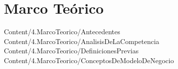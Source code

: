 \section{Marco Teórico}

{Content/4.MarcoTeorico/Antecedentes}
{Content/4.MarcoTeorico/AnalisisDeLaCompetencia}
{Content/4.MarcoTeorico/DefinicionesPrevias}
{Content/4.MarcoTeorico/ConceptosDeModeloDeNegocio}
